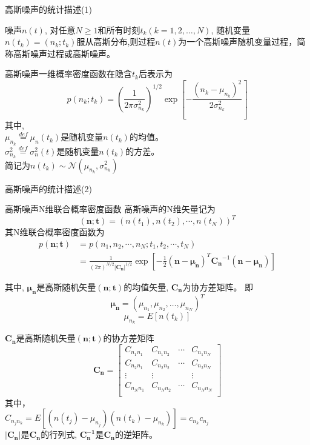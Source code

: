 \begin{frame}{高斯噪声的统计描述(1)}
\begin{definition}[高斯噪声]
	噪声$n(t)$, 对任意$N\ge 1$和所有时刻$t_k(k=1,2,\dots,N)$, 随机变量$n(t_k)=(n_k;t_k)$服从高斯分布,则过程$n(t)$为一个高斯噪声随机变量过程，简称高斯噪声过程或高斯噪声。
\end{definition}
\begin{block}{高斯噪声一维概率密度函数在隐含$t_k$后表示为}
	\[p(n_k;t_k)=(\frac{1}{2\pi\sigma_{n_k}^2})^{1/2}\exp\left[-\frac{(n_k-\mu_{n_k})^2}{2\sigma_{n_k}^2}\right] \]
	其中,\\
	$\mu_{n_k}\mathop{=}\limits^{def}\mu_n(t_k)$是随机变量$n(t_k)$的均值。\\
	$\sigma_{n_k}^2\mathop{=}\limits^{def}\sigma_n^2(t)$是随机变量$n(t_k)$的方差。\\
	简记为$n(t_k)\sim\mathcal{N}(\mu_{n_k},\sigma_{n_k}^2)$
\end{block}
\end{frame}

\begin{frame}{高斯噪声的统计描述(2)}
\begin{block}{高斯噪声N维联合概率密度函数}
高斯噪声的N维矢量记为
\[(\bm{n;t})=(n(t_1),n(t_2),\cdots,n(t_N))^T \]
其N维联合概率密度函数为
\begin{align*}
p(\bm{n;t})&=p(n_1,n_2,\cdots,n_N; t_1,t_2,\cdots,t_N)\\
&=\frac{1}{(2\pi)^{N/2}|\bm{C_n}|^{1/2}}\exp\left[-\frac{1}{2}(\bm{n-\mu_n})^T\bm{C_n}^{-1}(\bm{n-\mu_n})\right]
\end{align*}

其中, $\bm{\mu_{n}}$是高斯随机矢量$(\bm{n;t})$的均值矢量, $\bm{C_n}$为协方差矩阵。
即
$$\bm{\mu_n}=(\mu_{n_1},\mu_{n_2},\dots,\mu_{n_N})^T$$
$$\mu_{n_k}=E[n(t_k)]$$
\end{block}
\end{frame}

\begin{frame}
$\bm{C_n}$是高斯随机矢量$\bm{(n;t)}$的协方差矩阵
$$
\bm{C_n}=\left[
\begin{matrix}
C_{n_1n_1} & C_{n_1n_2} & \cdots &C_{n_1n_N} \\
C_{n_2n_1} & C_{n_2n_2} & \cdots &C_{n_2n_N} \\
\vdots     &  \vdots    &        &\vdots \\
C_{n_Nn_1} & C_{n_Nn_2} & \cdots &C_{n_Nn_N} \\
\end{matrix}
\right]
$$
其中，\\
$C_{n_jn_k}=E[(n(t_j)-\mu_{n_j})(n(t_k)-\mu_{n_k})]=c_{n_k}c_{n_j}$\\
$|\bm{C_n}|$是$\bm{C_n}$的行列式, $\bm{C_n^{-1}}$是$\bm{C_n}$的逆矩阵。
\end{frame}

